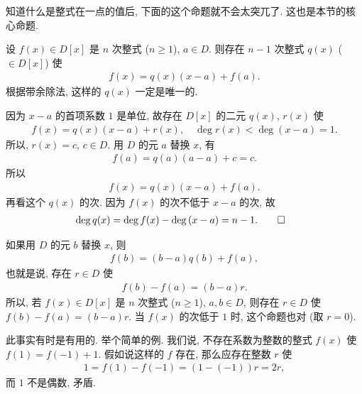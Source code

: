 知道什么是整式在一点的值后, 下面的这个命题就不会太突兀了. 这也是本节的核心命题.

\begin{proposition}
    设 $f(x) \in D[x]$ 是 $n$ 次整式 ($n \geq 1$), $a \in D$. 则存在 $n-1$ 次整式 $q(x)$ ($\in D[x]$) 使
    \begin{align*}
        f(x) = q(x) (x-a) + f(a).
    \end{align*}
    根据带余除法, 这样的 $q(x)$ 一定是唯一的.
\end{proposition}

\begin{pf}
    因为 $x-a$ 的首项系数 $1$ 是单位, 故存在 $D[x]$ 的二元 $q(x)$, $r(x)$ 使
    \begin{align*}
        f(x) = q(x) (x-a) + r(x), \quad \deg r(x) < \deg {(x-a)} = 1.
    \end{align*}
    所以, $r(x) = c$, $c \in D$. 用 $D$ 的元 $a$ 替换 $x$, 有
    \begin{align*}
        f(a) = q(a) (a-a) + c = c.
    \end{align*}
    所以
    \begin{align*}
        f(x) = q(x) (x-a) + f(a).
    \end{align*}
    再看这个 $q(x)$ 的次. 因为 $f(x)$ 的次不低于 $x-a$ 的次, 故
    \begin{align*}
         & \deg q(x) = \deg f(x) - \deg {(x-a)} = n-1. \qedhere
    \end{align*}
\end{pf}

\begin{remark}
    如果用 $D$ 的元 $b$ 替换 $x$, 则
    \begin{align*}
        f(b) = (b-a)q(b) + f(a),
    \end{align*}
    也就是说, 存在 $r \in D$ 使
    \begin{align*}
        f(b) - f(a) = (b-a)r.
    \end{align*}
    所以, 若 $f(x) \in D[x]$ 是 $n$ 次整式 ($n \geq 1$), $a,b \in D$, 则存在 $r \in D$ 使 $f(b) - f(a) = (b-a)r$. 当 $f(x)$ 的次低于 $1$ 时, 这个命题也对 (取 $r=0$).

    此事实有时是有用的. 举个简单的例. 我们说, 不存在系数为整数的整式 $f(x)$ 使 $f(1) = f(-1) + 1$. 假如说这样的 $f$ 存在, 那么应存在整数 $r$ 使
    \begin{align*}
        1 = f(1) - f(-1) = (1 - (-1))r = 2r,
    \end{align*}
    而 $1$ 不是偶数, 矛盾.
\end{remark}
